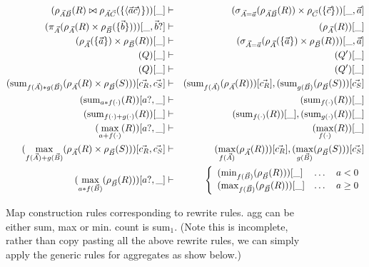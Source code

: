 \begin{figure*}
\begin{center}
\begin{eqnarray}
(\rho_{\vec{A}\vec{B}}(R) \bowtie
\rho_{\vec{A}\vec{C}}(\{{\langle\vec{a}\vec{c}\rangle} \}))[\_]
& \vdash &
(\sigma_{\vec{A}=\vec{a}}(\rho_{\vec{A}\vec{B}}(R))
\times \rho_{\vec{C}}(\{ \vec{c} \}))[\_,\vec{a}]
\label{mr1}
\\
(\pi_{\vec{A}}(\rho_{\vec{A}}(R) \times
\rho_{\vec{B}}(\{ \vec{b}\})))[\_,\vec{b}?]
& \vdash &
(\rho_{\vec{A}}(R))[\_]
\label{mr2}
\\
(\rho_{\vec{A}}(\{\vec{a}\}) \times \rho_{\vec{B}}(R))[\_]
& \vdash &
(\sigma_{\vec{A}=\vec{a}}(\rho_{\vec{A}}(\{\vec{a}\})
\times \rho_{\vec{B}}(R)))[\_,\vec{a}]
\label{mr3}
\\
(Q)[\_] & \vdash & (Q')[\_] \\
(Q)[\_] & \vdash & (Q')[\_] \\
(\mathrm{sum}_{f(\vec{A}) * g(\vec{B})}
(\rho_{\vec{A}}(R) \times
\rho_{\vec{B}}(S)))[\vec{c_R},\vec{c_S}]
& \vdash &
(\mathrm{sum}_{f(\vec{A})}(\rho_{\vec{A}}(R)))[\vec{c_R}], 
(\mathrm{sum}_{g(\vec{B})}(\rho_{\vec{B}}(S)))[\vec{c_S}]
\label{mr6}
\\
(\mathrm{sum}_{a * f(\cdot)}(R))[a?,\_]
& \vdash &
(\mathrm{sum}_{f(\cdot)}(R))[\_]
\label{mr7}
\\
(\mathrm{sum}_{f(\cdot) + g(\cdot)}(R))[\_]
& \vdash &
(\mathrm{sum}_{f(\cdot)}(R))[\_],
(\mathrm{sum}_{g(\cdot)}(R))[\_]
\label{mr8}
\\
(\max_{a+f(\cdot)}(R))[a?,\_] & \vdash & (\max_{f(\cdot)}(R))[\_]
\label{mr9}
\\
(\max_{f(\vec{A}) + g(\vec{B})}(\rho_{\vec{A}}(R) \times
\rho_{\vec{B}}(S)))[\vec{c_R},\vec{c_S}]
& \vdash &
(\max_{f(\vec{A})}(\rho_{\vec{A}}(R)))[\vec{c_R}],
(\max_{g(\vec{B})}(\rho_{\vec{B}}(S)))[\vec{c_S}]
\label{mr10}
\\
(\max_{a * f(\vec{B})}(\rho_{\vec{B}}(R)))[a?,\_]
&\vdash&
\left\{
\begin{array}{lll}
(\min_{f(\vec{B})}(\rho_{\vec{B}}(R)))[\_] & \dots & a < 0 \\
(\max_{f(\vec{B})}(\rho_{\vec{B}}(R)))[\_] & \dots & a \geq 0
\end{array}
\right.
\label{mr11}
\\
\end{eqnarray}
\end{center}
\caption{Map construction rules corresponding to rewrite rules. agg can be
either sum, max or min. count is sum$_1$. (Note this is incomplete,
rather than copy pasting all the above rewrite rules, we can simply apply the
generic rules for aggregates as show below.)}
\label{fig:maprules}
\end{figure*}

